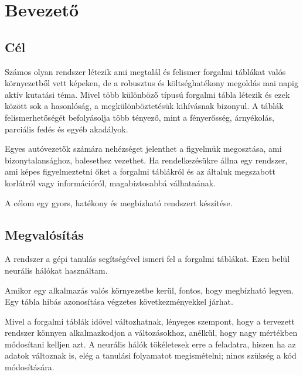 \chapter{Bevezető}\label{ch:INTRO}

\section{Cél}\label{sec:INTRO:goal}
Számos olyan rendszer létezik ami megtalál és felismer forgalmi táblákat valós környezetből vett képeken, de a robusztus és költséghatékony megoldás mai napig aktív kutatási téma. Mivel több különböző típusú forgalmi tábla létezik és ezek között sok a hasonlóság, a megkülönböztetésük kihívásnak bizonyul. A táblák felismerhetőségét befolyásolja több tényező, mint a fényerősség, árnyékolás, parciális fedés és egyéb akadályok.

Egyes autóvezetők számára nehézséget jelenthet a figyelmük megosztása, ami bizonytalansághoz, balesethez vezethet. Ha rendelkezésükre állna egy rendszer, ami képes figyelmeztetni őket a forgalmi táblákról és az általuk megszabott korlátról vagy információról, magabiztosabbá válhatnának.

A célom egy gyors, hatékony és megbízható rendszert készítése.

\section{Megvalósítás}\label{sec:INTRO:implement}

A rendszer a gépi tanulás segítségével ismeri fel a forgalmi táblákat. Ezen belül neurális hálókat használtam.

Amikor egy alkalmazás valós környezetbe kerül, fontos, hogy megbízható legyen. Egy tábla hibás azonosítása végzetes következményekkel járhat.

Mivel a forgalmi táblák idővel változhatnak, lényeges szempont, hogy a tervezett rendszer könnyen alkalmazkodjon a változásokhoz, anélkül, hogy nagy mértékben módosítani kelljen azt. A neurális hálók tökéletesek erre a feladatra, hiszen ha az adatok változnak is, elég a tanulási folyamatot megismételni; nincs szükség a kód módosítására.